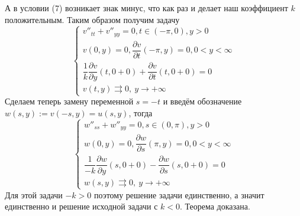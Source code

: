 \documentclass[9pt]{article}
\begin{document}
	А в условии (7) возникает знак минус, что как раз и делает наш коэффициент $k$ положительным.
	Таким образом получим задачу
	\begin{equation*}
		\begin{cases}
			v''_{tt} + v''_{yy} = 0, t \in (-\pi, 0), y > 0 \\
			v(0, y) = 0, \dfrac{\partial v}{\partial t} (-\pi, y) = 0, 0 < y < \infty \\
				\dfrac{1}{k} \dfrac{\partial v}{\partial y}(t,0+0) + \dfrac{\partial v}{\partial t}(t,0+0) = 0 \\
					v(t,y) \rightrightarrows 0, \ y \to +\infty 
		\end{cases}
	\end{equation*}
	Сделаем теперь замену переменной $s = -t$ и введём обозначение $w(s, y) := v(-s, y) = u(s,y)$, тогда
		\begin{equation*}
		\begin{cases}
			w''_{ss} + w''_{yy} = 0, s \in (0, \pi), y > 0 \\
			w(0, y) = 0, \dfrac{\partial w}{\partial s} (\pi, y) = 0, 0 < y < \infty \\
			\dfrac{1}{-k} \dfrac{\partial w}{\partial y}(s,0+0) - \dfrac{\partial w}{\partial s}(s,0+0) = 0 \\
			w(s,y) \rightrightarrows 0, \ y \to +\infty 
		\end{cases}
	\end{equation*}
	Для этой задачи $-k > 0$ поэтому решение задачи единственно, а значит единственно и решение исходной задачи с $ k < 0$. Теорема доказана.
\end{document}
